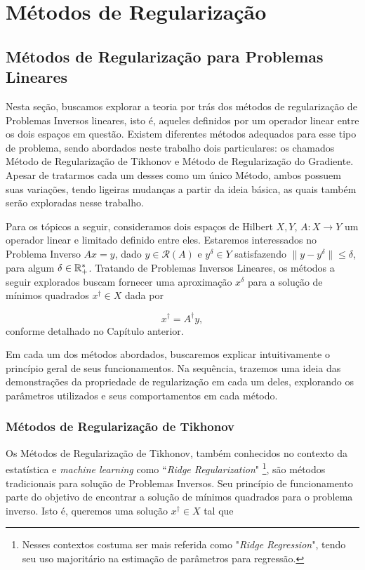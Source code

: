 \chapter{Métodos de Regularização}

\section{Métodos de Regularização para Problemas Lineares}

Nesta seção, buscamos explorar a teoria por trás dos métodos de regularização de Problemas Inversos lineares, isto é, aqueles definidos por um operador linear entre os dois espaços em questão. Existem diferentes métodos adequados para esse tipo de problema, sendo abordados neste trabalho dois particulares: os chamados Método de Regularização de Tikhonov e Método de Regularização do Gradiente. Apesar de tratarmos cada um desses como um único Método, ambos possuem suas variações, tendo ligeiras mudanças a partir da ideia básica, as quais também serão exploradas nesse trabalho.

Para os tópicos a seguir, consideramos dois espaços de Hilbert $X,Y$, $A: X \to Y$ um operador linear e limitado definido entre eles. Estaremos interessados no Problema Inverso $Ax = y$, dado $y \in \mathcal R(A)$ e $y^\delta \in Y$ satisfazendo $\| y - y^\delta \| \leq \delta$, para algum $\delta \in \mathbb{R}^*_+$. Tratando de Problemas Inversos Lineares, os métodos a seguir explorados buscam fornecer uma aproximação $x^\delta$ para a solução de mínimos quadrados $x^\dag \in X$ dada por

\begin{equation*}
    x^\dag = A^\dag y,
\end{equation*}
conforme detalhado no Capítulo anterior. 

Em cada um dos métodos abordados, buscaremos explicar intuitivamente o princípio geral de seus funcionamentos. Na sequência, trazemos uma ideia das demonstrações da propriedade de regularização em cada um deles, explorando os parâmetros utilizados e seus comportamentos em cada método. 

\subsection{Métodos de Regularização de Tikhonov}

Os Métodos de Regularização de Tikhonov, também conhecidos no contexto da estatística e \textit{machine learning} como ``\textit{Ridge Regularization}" \footnote{Nesses contextos costuma ser mais referida como "\textit{Ridge Regression}", tendo seu uso majoritário na estimação de parâmetros para regressão.}, são métodos tradicionais para solução de Problemas Inversos. Seu princípio de funcionamento parte do objetivo de encontrar a solução de mínimos quadrados para o problema inverso. Isto é, queremos uma solução $x^\dag \in X$ tal que

